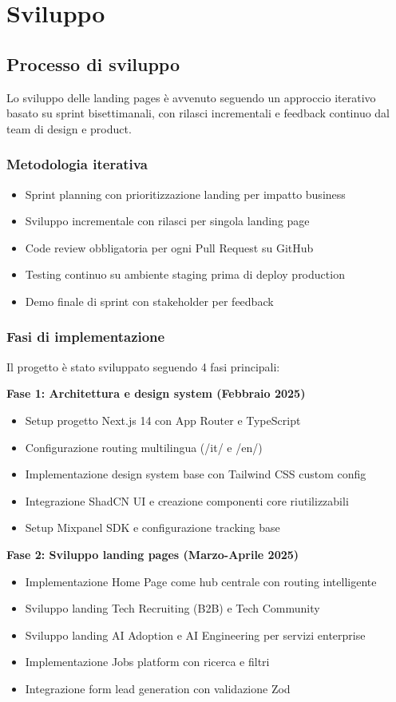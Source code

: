 \chapter{Sviluppo}

\section{Processo di sviluppo}
Lo sviluppo delle landing pages è avvenuto seguendo un approccio 
iterativo basato su sprint bisettimanali, con rilasci incrementali e 
feedback continuo dal team di design e product.

\subsection{Metodologia iterativa}
\begin{itemize}
  \item Sprint planning con prioritizzazione landing per impatto business
  \item Sviluppo incrementale con rilasci per singola landing page
  \item Code review obbligatoria per ogni Pull Request su GitHub
  \item Testing continuo su ambiente staging prima di deploy production
  \item Demo finale di sprint con stakeholder per feedback
\end{itemize}

\subsection{Fasi di implementazione}
Il progetto è stato sviluppato seguendo 4 fasi principali:

\textbf{Fase 1: Architettura e design system (Febbraio 2025)}
\begin{itemize}
  \item Setup progetto Next.js 14 con App Router e TypeScript
  \item Configurazione routing multilingua (/it/ e /en/)
  \item Implementazione design system base con Tailwind CSS custom config
  \item Integrazione ShadCN UI e creazione componenti core riutilizzabili
  \item Setup Mixpanel SDK e configurazione tracking base
\end{itemize}

\textbf{Fase 2: Sviluppo landing pages (Marzo-Aprile 2025)}
\begin{itemize}
  \item Implementazione Home Page come hub centrale con routing 
        intelligente
  \item Sviluppo landing Tech Recruiting (B2B) e Tech Community
  \item Sviluppo landing AI Adoption e AI Engineering per servizi enterprise
  \item Implementazione Jobs platform con ricerca e filtri
  \item Integrazione form lead generation con validazione Zod
\end{itemize}

